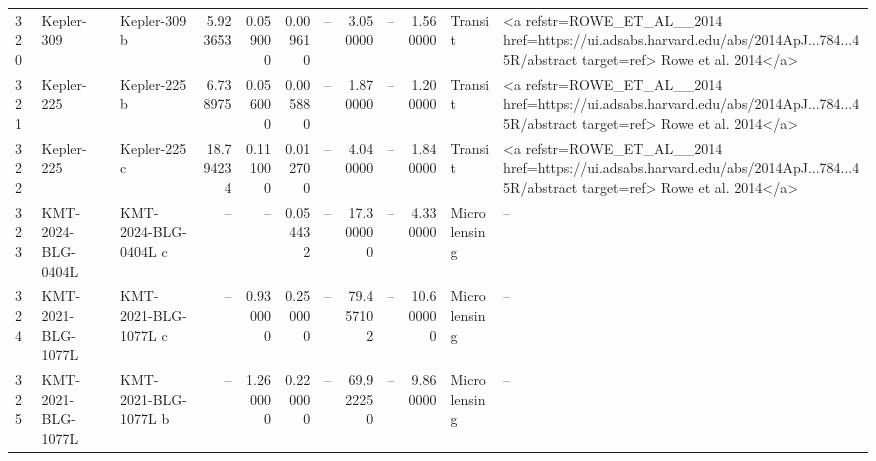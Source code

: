 \begin{tabular}{lllrrrrrrrll}
320 & Kepler-309 & Kepler-309 b & 5.923653 & 0.059000 & 0.009610 & -- & 3.050000 & -- & 1.560000 & Transit & <a refstr=ROWE_ET_AL__2014 href=https://ui.adsabs.harvard.edu/abs/2014ApJ...784...45R/abstract target=ref> Rowe et al. 2014</a> \\
321 & Kepler-225 & Kepler-225 b & 6.738975 & 0.056000 & 0.005880 & -- & 1.870000 & -- & 1.200000 & Transit & <a refstr=ROWE_ET_AL__2014 href=https://ui.adsabs.harvard.edu/abs/2014ApJ...784...45R/abstract target=ref> Rowe et al. 2014</a> \\
322 & Kepler-225 & Kepler-225 c & 18.794234 & 0.111000 & 0.012700 & -- & 4.040000 & -- & 1.840000 & Transit & <a refstr=ROWE_ET_AL__2014 href=https://ui.adsabs.harvard.edu/abs/2014ApJ...784...45R/abstract target=ref> Rowe et al. 2014</a> \\
323 & KMT-2024-BLG-0404L & KMT-2024-BLG-0404L c & -- & -- & 0.054432 & -- & 17.300000 & -- & 4.330000 & Microlensing & -- \\
324 & KMT-2021-BLG-1077L & KMT-2021-BLG-1077L c & -- & 0.930000 & 0.250000 & -- & 79.457102 & -- & 10.600000 & Microlensing & -- \\
325 & KMT-2021-BLG-1077L & KMT-2021-BLG-1077L b & -- & 1.260000 & 0.220000 & -- & 69.922250 & -- & 9.860000 & Microlensing & -- \\
\bottomrule
\end{tabular}

